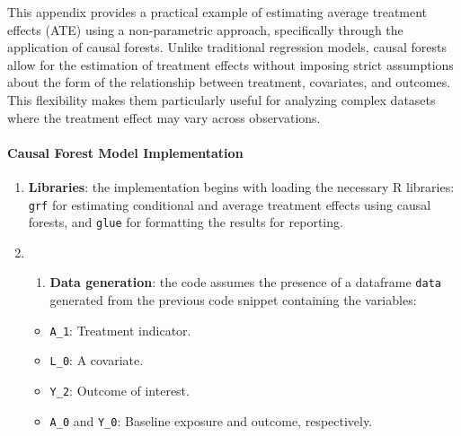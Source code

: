 \documentclass[
  singlecolumn]{article}
\let\oldparagraph\paragraph
\renewcommand{\paragraph}[1]{\oldparagraph{#1}\mbox{}}
\providecommand{\tightlist}{%
  \setlength{\itemsep}{0pt}\setlength{\parskip}{0pt}}\usepackage{longtable,booktabs,array}
\begin{document}
This appendix provides a practical example of estimating average
treatment effects (ATE) using a non-parametric approach, specifically
through the application of causal forests. Unlike traditional regression
models, causal forests allow for the estimation of treatment effects
without imposing strict assumptions about the form of the relationship
between treatment, covariates, and outcomes. This flexibility makes them
particularly useful for analyzing complex datasets where the treatment
effect may vary across observations.

\paragraph{Causal Forest Model
Implementation}\label{causal-forest-model-implementation}

\begin{enumerate}
\def\labelenumi{\arabic{enumi}.}
\item
  \textbf{Libraries}: the implementation begins with loading the
  necessary R libraries: \texttt{grf} for estimating conditional and
  average treatment effects using causal forests, and \texttt{glue} for
  formatting the results for reporting.
\item
  \begin{enumerate}
  \def\labelenumii{\arabic{enumii}.}
  \tightlist
  \item
    \textbf{Data generation}: the code assumes the presence of a
    dataframe \texttt{data} generated from the previous code snippet
    containing the variables:
  \end{enumerate}

  \begin{itemize}
  \tightlist
  \item
    \texttt{A\_1}: Treatment indicator.
  \item
    \texttt{L\_0}: A covariate.
  \item
    \texttt{Y\_2}: Outcome of interest.
  \item
    \texttt{A\_0} and \texttt{Y\_0}: Baseline exposure and outcome,
    respectively.
  \end{itemize}


\end{enumerate}
\end{document}
